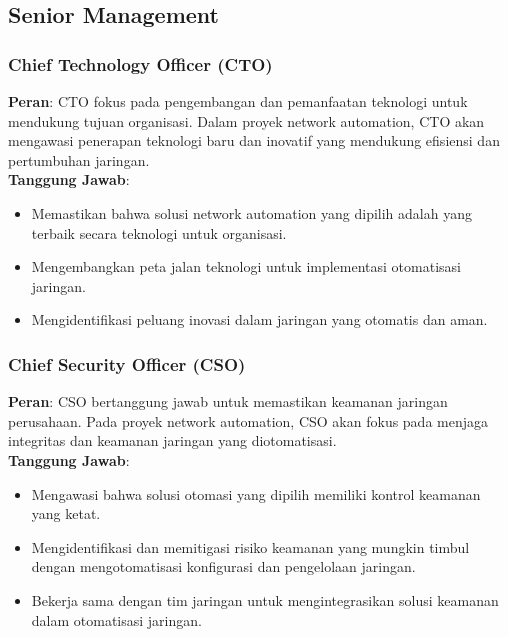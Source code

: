 \subsection{Senior Management}

\subsubsection{Chief Technology Officer (CTO)}
\textbf{Peran}: CTO fokus pada pengembangan dan pemanfaatan teknologi untuk mendukung tujuan organisasi. Dalam proyek network automation, CTO akan mengawasi penerapan teknologi baru dan inovatif yang mendukung efisiensi dan pertumbuhan jaringan. \\
\textbf{Tanggung Jawab}:
\begin{itemize}
    \item Memastikan bahwa solusi network automation yang dipilih adalah yang terbaik secara teknologi untuk organisasi.
    \item Mengembangkan peta jalan teknologi untuk implementasi otomatisasi jaringan.
    \item Mengidentifikasi peluang inovasi dalam jaringan yang otomatis dan aman.
\end{itemize}

\subsubsection{Chief Security Officer (CSO)}
\textbf{Peran}: CSO bertanggung jawab untuk memastikan keamanan jaringan perusahaan. Pada proyek network automation, CSO akan fokus pada menjaga integritas dan keamanan jaringan yang diotomatisasi. \\
\textbf{Tanggung Jawab}:
\begin{itemize}
    \item Mengawasi bahwa solusi otomasi yang dipilih memiliki kontrol keamanan yang ketat.
    \item Mengidentifikasi dan memitigasi risiko keamanan yang mungkin timbul dengan mengotomatisasi konfigurasi dan pengelolaan jaringan.
    \item Bekerja sama dengan tim jaringan untuk mengintegrasikan solusi keamanan dalam otomatisasi jaringan.
\end{itemize}

